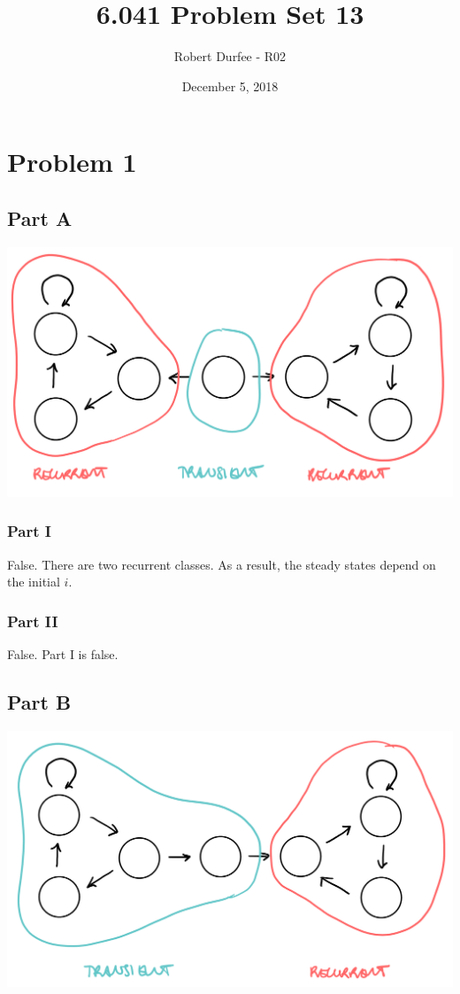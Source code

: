\documentclass{article}
\title{6.041 Problem Set 13}
\author{Robert Durfee - R02}
\date{December 5, 2018}
\begin{document}
\maketitle

\section*{Problem 1}

\subsection*{Part A}

\begin{center}
    \includegraphics[scale=0.25]{Images/P1A.PNG}
\end{center}

\subsubsection*{Part I}

False. There are two recurrent classes. As a result, the steady states depend
on the initial $i$.

\subsubsection*{Part II}

False. Part I is false.

\subsection*{Part B}

\begin{center}
    \includegraphics[scale=0.25]{Images/P1B.PNG}
\end{center}
\end{document}
